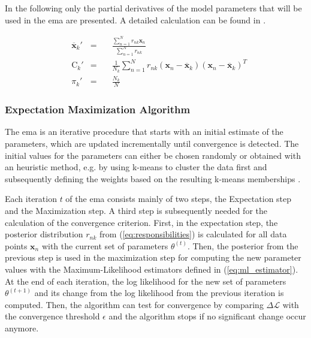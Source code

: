 In the following only the partial derivatives of the model parameters that will be used in the \acrshort{ema} are presented. A detailed calculation can be found in \cite[pp.319]{dei_2020}.

\begin{equation}\label{eq:ml_estimator}
    \begin{aligned}
    &\overline{\bm{x}}_k' &= \quad &\frac{\sum_{n=1}^N r_{nk}\bm{x}_n}{\sum_{n=1}^N r_{nk}} \\
    &\bm{\mathrm{C}}_k' &= \quad &\frac{1}{N_k}\sum\limits_{n=1}^N r_{nk}(\bm{x}_n-\overline{\bm{x}}_k)(\bm{x}_n-\overline{\bm{x}}_k)^T\\
    &\pi_k' &= \quad &\frac{N_k}{N}
    \end{aligned}
\end{equation}

\subsubsection{Expectation Maximization Algorithm} \label{ch:Expectation_Maximization_Algorithm}

The \acrshort{ema} is an iterative procedure that starts with an initial estimate of the parameters, which are updated incrementally until convergence is detected. The initial values for the parameters can either be chosen randomly or obtained with an heuristic method, e.g. by using k-means to cluster the data first and subsequently defining the weights based on the resulting k-means memberships \cite[pp. 325]{dei_2020}. 

Each iteration $t$ of the \acrshort{ema} consists mainly of two steps, the Expectation step and the Maximization step. A third step is subsequently needed for the calculation of the convergence criterion. First, in the expectation step, the posterior distribution $r_{nk}$ from (\ref{eq:responsibilities}) is calculated for all data points $\bm{x}_n$ with the current set of parameters $\theta^{(t)}$. Then, the posterior from the previous step is used in the maximization step for computing the new parameter values with the Maximum-Likelihood estimators defined in (\ref{eq:ml_estimator}). At the end of each iteration, the log likelihood for the new set of parameters $\theta^{(t+1)}$ and its change from the log likelihood from the previous iteration is computed. Then, the algorithm can test for convergence by comparing $\Delta \mathcal{L}$ with the convergence threshold $\epsilon$ and the algorithm stops if no significant change occur anymore.

